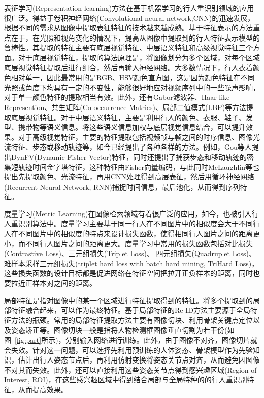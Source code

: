 表征学习(Representation learning)方法在基于机器学习的行人重识别领域的应用很广泛。得益于卷积神经网络(Convolutional neural network,CNN)的迅速发展，根据不同的需求从图像中提取表征特征的技术越来越成熟。基于特征表示的方法重点在于，在光照和视角变化的情况下，提高从图像中提取到的行人特征表示模型的鲁棒性。其提取的特征主要有底层视觉特征、中层语义特征和高级视觉特征三个方面。对于底层视觉特征，提取的算法原理是，将图像划分为多个区域，对每个区域底层视觉特征提取后进行组合，然后再输入神经网络。大多数情况下，行人衣着颜色相对单一，因此最常用的是RGB、HSV颜色直方图，这是因为颜色特征在不同光照或角度下均具有一定的不变性，能够很好地应对视频序列中的一些噪声影响，对于单一颜色特征的提取相当有效。此外，还有Gabor滤波器、Haar-like Represention、共生矩阵(Co-occurrence Matrics)、局部二值模式(LBP)等方法提取底层视觉特征。对于中层语义特征，主要是利用行人的颜色、衣服、鞋子、发型、携带物等语义信息。将这些语义信息加权与底层视觉信息结合，可以提升效果。对于高级视觉特征，主要的特征提取包括视频帧与帧之间的时序信息、图像光流特征、步态或移动轨迹等，如今已经提出了各种各样的方法。例如，Gou\cite{gou2016person}等人提出DynFV(Dynamic Fisher Vector)特征，同时还提出了捕获步态和移动轨迹的密集短轨迹时间金字塔特征，这种特征由Fisher向量编码，与此同时McLaughlin\cite{mclaughlin2016recurrent}等也提出先提取颜色、光流特征，再用CNN处理得到高层表征，然后用循环神经网络(Recurrent Neural Network, RNN)捕捉时间信息，最后池化，从而得到序列特征。

度量学习(Metric Learning)在图像检索领域有着很广泛的应用，如今，也被引入行人重识别算法中。度量学习主要基于同一行人在不同图片中的相似度会大于不同行人在不同图片中的相似度的特点来设计损失函数，使得相同行人图片之间的距离更小，而不同行人图片之间的距离更大。度量学习中常用的损失函数包括对比损失(Contrastive Loss)、三元组损失(Triplet Loss)、 四元组损失(Quadruplet Loss)、难样本采样三元组损失(triplet hard loss with batch hard mining, TriHard Loss)，这些损失函数的设计目标都是促进网络在特征空间把拉开正负样本的距离，同时也要拉近正样本对之间的距离。

局部特征是指对图像中的某一个区域进行特征提取得到的特征。将多个提取到的局部特征融合起来，可以作为最终特征。基于局部特征的Re-ID方法主要源于全局特征方法的瓶颈。常用的局部特征提取方法主要有图像切块、利用骨架关键点定位以及姿态矫正等。图像切块一般是指将人物检测框图像垂直切割为若干份(如图~\ref{fig:part}所示\cite{varior2016siamese})，分别输入网络进行训练。此外，由于图像不对齐，图像切片就会失效。针对这一问题，可以选择先利用预训练的人体姿态、骨架模型作为先验知识，估计出行人姿态节点后，再利用仿射变换将姿态关节点对齐，从而避免因图像不对其而失效。此外，还可以直接利用这些姿态关节点得到感兴趣区域(Region of Interest, ROI)\cite{zhao2017spindle}，在这些感兴趣区域中得到结合局部与全局特种的的行人重识别特征，从而提高效果。

